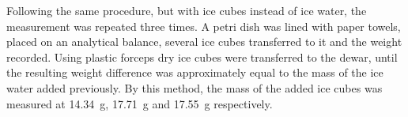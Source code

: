 Following the same procedure, but with ice cubes instead of ice water, the measurement was repeated three times. A petri dish was lined with paper towels, placed on an analytical balance, several ice cubes transferred to it and the weight recorded. Using plastic forceps dry ice cubes were transferred to the dewar, until the resulting weight difference was approximately equal to the mass of the ice water added previously. By this method, the mass of the added ice cubes was measured at \qty{14.34}{\gram}, \qty{17.71}{\gram} and \qty{17.55}{\gram} respectively. 




